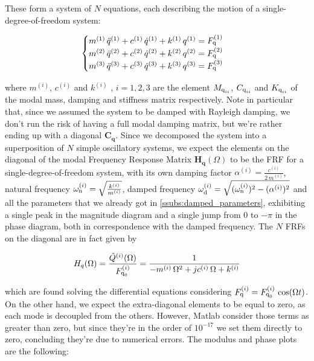 \documentclass[a4paper,12pt,oneside]{article}
\begin{document}
These form a system of $ N $ equations, each describing the motion of a single-degree-of-freedom system:

\[ \begin{cases}
	m^{(1)} \, \ddot{q}^{(1)} + c^{(1)} \, \dot{q}^{(1)} + k^{(1)} \, q^{(1)} =
		F_\textup{q}^{(1)} \\
	m^{(2)} \, \ddot{q}^{(2)} + c^{(2)} \, \dot{q}^{(2)} + k^{(2)} \, q^{(2)} =
		F_\textup{q}^{(2)} \\
	m^{(3)} \, \ddot{q}^{(3)} + c^{(3)} \, \dot{q}^{(3)} + k^{(3)} \, q^{(3)} =
		F_\textup{q}^{(3)}
\end{cases} \]

\vspace{10pt}

where $ m^{(i)} $, $ c^{(i)} $ and $ k^{(i)} \text{ , } i = 1,2,3 $ are the element $ M_{\textup{q}_{ii}} $, $ C_{\textup{q}_{ii}} $ and $ K_{\textup{q}_{ii}} $ of the modal mass, damping and stiffness matrix respectively. Note in particular that, since we assumed the system to be damped with Rayleigh damping, we don't run the risk of having a full modal damping matrix, but we're rather ending up with a diagonal $ \mathbf{C_q} $. Since we decomposed the system into a superposition of $ N $ simple oscillatory systems, we expect the elements on the diagonal of the modal Frequency Response Matrix $ \mathbf{H_q}(\Omega) $ to be the FRF for a single-degree-of-freedom system, with its own damping factor $ \alpha^{(i)} = \frac{c^{(i)}}{2 \, m^{(i)}} $, natural frequency $ \omega_\textup{n}^{(i)} = \sqrt{\frac{k^{(i)}}{m^{(i)}}} $, damped frequency $ \omega_\textup{d}^{(i)} = \sqrt{(\omega_\textup{n}^{(i)})^2 - (\alpha^{(i)})^2} $ and all the parameters that we already got in \ref{ssubs:damped_parameters}, exhibiting a single peak in the magnitude diagram and a single jump from $ 0 $ to $ -\pi $ in the phase diagram, both in correspondence with the damped frequency. The $ N $ FRFs on the diagonal are in fact given by

\[
	H_q(\Omega) = \frac{\tilde{Q}^{(i)}(\Omega)}{F_{\textup{q}_0}^{(i)}} =
	\frac{1}{-m^{(i)} \, \Omega^2 + j c^{(i)} \, \Omega + k^{(i)}}
\]

which are found solving the differential equations considering $ F_\textup{q}^{(i)} = F_{\textup{q}_0}^{(i)} \, \cos(\Omega t) $. On the other hand, we expect the extra-diagonal elements  to be equal to zero, as each  mode is decoupled from the others. However, Matlab consider those terms as greater than zero, but since they're in the order of $ 10^{-17} $ we set them directly to zero, concluding they're due to numerical errors. The modulus and phase plots are the following:
\end{document}

